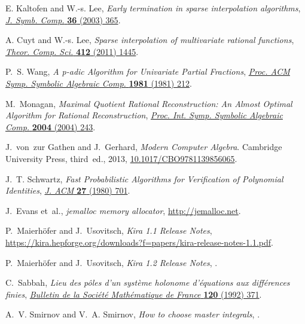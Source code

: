 \documentclass[11pt,a4paper,DIV=11,numbers=noenddot,parskip=half]{scrartcl}
\begin{document}
\begin{thebibliography}{10}
{E. Kaltofen and W.-s. Lee}, \emph{{Early termination in sparse interpolation
  algorithms}}, \href{https://doi.org/10.1016/S0747-7171(03)00088-9}{\emph{J.
  Symb. Comp.} {\bfseries 36} (2003) 365}.

{A. Cuyt and W.-s. Lee}, \emph{{Sparse interpolation of multivariate rational
  functions}}, \href{https://doi.org/10.1016/j.tcs.2010.11.050}{\emph{Theor.
  Comp. Sci.} {\bfseries 412} (2011) 1445}.

P.~S. Wang, \emph{{A p-adic Algorithm for Univariate Partial Fractions}},
  \href{https://doi.org/10.1145/800206.806398}{\emph{Proc. ACM Symp. Symbolic
  Algebraic Comp.} {\bfseries 1981} (1981) 212}.

M.~Monagan, \emph{{Maximal Quotient Rational Reconstruction: An Almost Optimal
  Algorithm for Rational Reconstruction}},
  \href{https://doi.org/10.1145/1005285.1005321}{\emph{Proc. Int. Symp.
  Symbolic Algebraic Comp.} {\bfseries 2004} (2004) 243}.

J.~von~zur Gathen and J.~Gerhard, \emph{{Modern Computer Algebra}}. {Cambridge
  University Press}, {third}~ed., 2013,
  \href{https://doi.org/10.1017/CBO9781139856065}{10.1017/CBO9781139856065}.

J.~T. Schwartz, \emph{{Fast Probabilistic Algorithms for Verification of
  Polynomial Identities}},
  \href{https://doi.org/10.1145/322217.322225}{\emph{J. ACM} {\bfseries 27}
  (1980) 701}.

J.~Evans et~al., \emph{{jemalloc memory allocator}},
  \href{http://jemalloc.net}{http://jemalloc.net}.

P.~Maierhöfer and J.~Usovitsch, \emph{{Kira 1.1 Release Notes}},
  \href{https://kira.hepforge.org/downloads?f=papers/kira-release-notes-1.1.pdf}{https://kira.hepforge.org/downloads?f=papers/kira-release-notes-1.1.pdf}.

P.~Maierhöfer and J.~Usovitsch, \emph{{Kira 1.2 Release Notes}},
  \href{https://arxiv.org/abs/1812.01491}{{}}.

C.~Sabbah, \emph{Lieu des p\^oles d'un syst\`eme holonome d'\'equations aux
  diff\'erences finies},
  \href{https://doi.org/10.24033/bsmf.2191}{\emph{Bulletin de la Soci\'et\'e
  Math\'ematique de France} {\bfseries 120} (1992) 371}.

A.~V. Smirnov and V.~A. Smirnov, \emph{{How to choose master integrals}},
  \href{https://arxiv.org/abs/2002.08042}{{}}.


\end{thebibliography}
\end{document}
